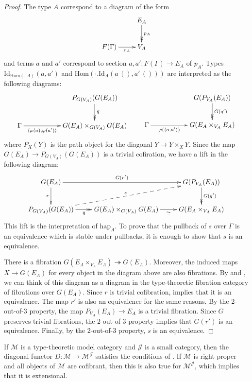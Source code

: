 \documentclass[reqno]{amsart}
\theoremstyle{definition}
\theoremstyle{remark}
\newcommand{\fs}[1]{\mathrm{#1}}
\newcommand{\scat}[1]{\mathcal{#1}}
\newcommand{\Hom}{\fs{Hom}}
\newcommand{\Id}{\fs{Id}}
\numberwithin{figure}{section}
\begin{document}
\begin{proof}
The type $A$ correspond to a diagram of the form
\[ \xymatrix{                           & E_A \ar@{->>}[d]^{p_A} \\
              F(\Gamma) \ar[r]_-{r_A}   & V_A
            } \]
and terms $a$ and $a'$ correspond to section $a,a' : F(\Gamma) \to E_A$ of $p_A$.
Types $\Id_{\Hom(\cdot . A)}(a,a')$ and $\Hom(\cdot . \Id_A(a\,(),a'\,()))$ are interpreted as the following diagrams:
\[ \xymatrix{                                                           & & P_{G(V_A)}(G(E_A)) \ar@{->>}[d]^q \\
              \Gamma \ar[rr]_-{\langle \varphi(a), \varphi(a') \rangle} & & G(E_A) \times_{G(V_A)} G(E_A)
            } \qquad
   \xymatrix{                                                   & & G(P_{V_A}(E_A)) \ar@{->>}[d]^{G(q')} \\
              \Gamma \ar[rr]_-{\varphi(\langle a, a' \rangle)}  & & G(E_A \times_{V_A} E_A)
            } \]
where $P_{X}(Y)$ is the path object for the diagonal $Y \to Y \times_{X} Y$.
Since the map $G(E_A) \to P_{G(V_A)}(G(E_A))$ is a trivial cofiration, we have a lift in the following diagram:
\[ \xymatrix{ G(E_A) \ar[d]_r \ar[rr]^-{G(r')}                      &                                               & G(P_{V_A}(E_A)) \ar@{->>}[d]^{G(q')} \\
              P_{G(V_A)}(G(E_A)) \ar@{->>}[r]_-q \ar@{-->}[urr]^s   & G(E_A) \times_{G(V_A)} G(E_A) \ar[r]_-\simeq  & G(E_A \times_{V_A} E_A)
            } \]
This lift is the interpretation of $\fs{hap}_A$.
To prove that the pullback of $s$ over $\Gamma$ is an equivalence which is stable under pullbacks, it is enough to show that $s$ is an equivalence.

There is a fibration $G(E_A \times_{V_A} E_A) \twoheadrightarrow G(E_A)$.
Moreover, the induced maps $X \to G(E_A)$ for every object in the diagram above are also fibrations.
By  and , we can think of this diagram as a diagram in the type-theoretic fibration category of fibrations over $G(E_A)$.
Since $r$ is trivial cofibration, \cite[Lemma~3.6]{shul-inv} implies that it is an equivalence.
The map $r'$ is also an equivalence for the same reasons.
By the 2-out-of-3 property, the map $P_{V_A}(E_A) \to E_A$ is a trivial fibration.
Since $G$ preserves trivial fibrations, the 2-out-of-3 property implies that $G(r')$ is an equivalence.
Finally, by the 2-out-of-3 property, $s$ is an equivalence.
\end{proof}

\begin{example}
If $\scat{M}$ is a type-theoretic model category and $\scat{J}$ is a small category, then the diagonal functor $D :\scat{M} \to \scat{M}^\scat{J}$ satisfies the conditions of .
If $\scat{M}$ is right proper and all objects of $\scat{M}$ are cofibrant, then this is also true for $\scat{M}^\scat{J}$, which implies that it is extensional.
\end{example}
\end{document}
